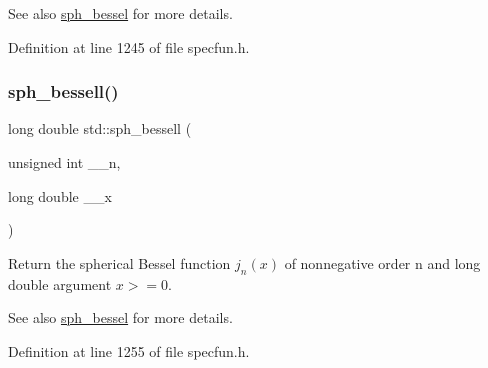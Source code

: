 \begin{DoxySeeAlso}{See also}
\hyperlink{group__tr29124__math__spec__func_gad125841d7c85e461cb8954952e3a17c8}{sph\+\_\+bessel} for more details. 
\end{DoxySeeAlso}


Definition at line 1245 of file specfun.\+h.

\mbox{\label{group__tr29124__math__spec__func_ga11d72b1af81ce9da3c878a25087ee927}} 
\subsubsection{\texorpdfstring{sph\+\_\+bessell()}{sph\_bessell()}}
{\footnotesize\ttfamily long double std\+::sph\+\_\+bessell (\begin{DoxyParamCaption}\item[{unsigned int}]{\+\_\+\+\_\+n,  }\item[{long double}]{\+\_\+\+\_\+x }\end{DoxyParamCaption})\hspace{0.3cm}{\ttfamily [inline]}}

Return the spherical Bessel function $ j_n(x) $ of nonnegative order n and {\ttfamily long double} argument $ x >= 0 $.

\begin{DoxySeeAlso}{See also}
\hyperlink{group__tr29124__math__spec__func_gad125841d7c85e461cb8954952e3a17c8}{sph\+\_\+bessel} for more details. 
\end{DoxySeeAlso}


Definition at line 1255 of file specfun.\+h.

\mbox{\label{group__tr29124__math__spec__func_gacef0d41a7ce572a9ace3437498794ed0}} 
